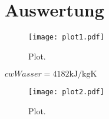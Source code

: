 \section{Auswertung}
\label{sec:Auswertung}

\begin{figure}
  \centering
  \texttt{[image: plot1.pdf]}
  \caption{Plot.}
  \label{fig:plot1}
\end{figure}






$cw Wasser= 4182 \si{\kilo\joule\per\kilo\gram\kelvin}$\cite[381]{PhyPrak}
\begin{figure}
  \centering
  \texttt{[image: plot2.pdf]}
  \caption{Plot.}
  \label{fig:plot2}
\end{figure}
